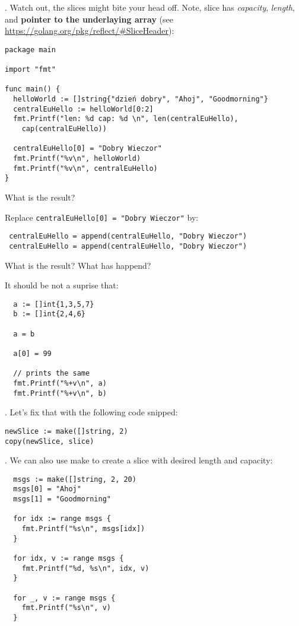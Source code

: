 \documentclass[11pt, letterpaper]{article}
\begin{document}
. Watch out, the slices might bite your head off. Note, slice has \emph{capacity}, \emph{length}, and \textbf{pointer to the underlaying array} (see \href{reflect.SliceHeader}{https://golang.org/pkg/reflect/\#SliceHeader}):
\begin{verbatim}
package main

import "fmt"

func main() {
  helloWorld := []string{"dzień dobry", "Ahoj", "Goodmorning"}
  centralEuHello := helloWorld[0:2]
  fmt.Printf("len: %d cap: %d \n", len(centralEuHello),
    cap(centralEuHello))

  centralEuHello[0] = "Dobry Wieczor"
  fmt.Printf("%v\n", helloWorld)
  fmt.Printf("%v\n", centralEuHello)
}
\end{verbatim}
What is the result?

\bigskip
\bigskip
Replace \texttt{centralEuHello[0] = "Dobry Wieczor"} by:

\begin{verbatim}
 centralEuHello = append(centralEuHello, "Dobry Wieczor")
 centralEuHello = append(centralEuHello, "Dobry Wieczor")
\end{verbatim}

What is the result? What has happend?

\bigskip
\bigskip
\bigskip
It should be not a suprise that:

\begin{verbatim}
  a := []int{1,3,5,7}
  b := []int{2,4,6}

  a = b

  a[0] = 99

  // prints the same
  fmt.Printf("%+v\n", a)
  fmt.Printf("%+v\n", b)
\end{verbatim}

. Let's fix that with the following code snipped:

\begin{verbatim}
newSlice := make([]string, 2)
copy(newSlice, slice)
\end{verbatim}

. We can also use make to create a slice with desired length and capacity:

\begin{verbatim}
  msgs := make([]string, 2, 20)
  msgs[0] = "Ahoj"
  msgs[1] = "Goodmorning"

  for idx := range msgs {
    fmt.Printf("%s\n", msgs[idx])
  }

  for idx, v := range msgs {
    fmt.Printf("%d, %s\n", idx, v)
  }

  for _, v := range msgs {
    fmt.Printf("%s\n", v)
  }
\end{verbatim}
\end{document}
